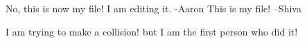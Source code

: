 No, this is now my file!
I am editing it. -Aaron
This is my file! --Shiva

I am trying to make a collision! but I am the first person who did it!
